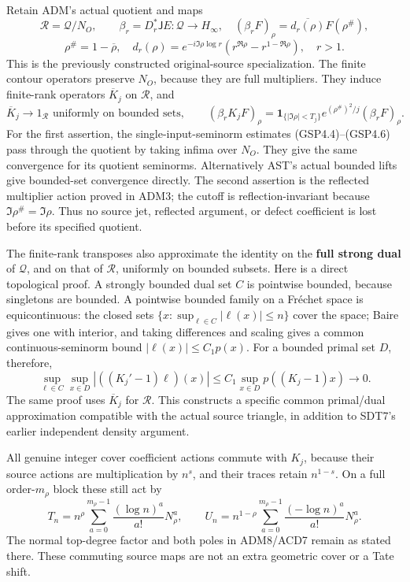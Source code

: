 Retain ADM's actual quotient and maps \[
\mathcal R=\mathcal Q/N_O,\qquad
\beta_r=D_r^*\mathsf J E:\mathcal Q\to H_\infty,
\quad (\beta_rF)_\rho=\overline{d_r(\rho)}F(\rho^\#),
\] \[
\rho^\#=1-\overline\rho,\quad
d_r(\rho)=e^{-i\Im\rho\log r}
(r^{\Re\rho}-r^{1-\Re\rho}),\quad r>1.
\tag{GSP7.1}
\] This is the previously constructed original-source specialization.
The finite contour operators preserve \(N_O\), because they are full
multipliers. They induce finite-rank operators \(\overline K_j\) on
\(\mathcal R\), and \[
\overline K_j\longrightarrow1_{\mathcal R}
\text{ uniformly on bounded sets},\qquad
(\beta_rK_jF)_\rho=
\mathbf1_{\{|\Im\rho|<T_j\}}e^{(\rho^\#)^2/j}(\beta_rF)_\rho.
\tag{GSP7.2}
\] For the first assertion, the single-input-seminorm estimates
(GSP4.4)--(GSP4.6) pass through the quotient by taking infima over
\(N_O\). They give the same convergence for its quotient seminorms.
Alternatively AST's actual bounded lifts give bounded-set convergence
directly. The second assertion is the reflected multiplier action proved
in ADM3; the cutoff is reflection-invariant because
\(\Im\rho^\#=\Im\rho\). Thus no source jet, reflected argument, or
defect coefficient is lost before its specified quotient.

The finite-rank transposes also approximate the identity on the
\textbf{full strong dual} of \(\mathcal Q\), and on that of
\(\mathcal R\), uniformly on bounded subsets. Here is a direct
topological proof. A strongly bounded dual set \(C\) is pointwise
bounded, because singletons are bounded. A pointwise bounded family on a
Fréchet space is equicontinuous: the closed sets
\(\{x:\sup_{\ell\in C}|\ell(x)|\le n\}\) cover the space; Baire gives
one with interior, and taking differences and scaling gives a common
continuous-seminorm bound \(|\ell(x)|\le C_1p(x)\). For a bounded primal
set \(D\), therefore, \[
\sup_{\ell\in C}\sup_{x\in D}
|((K_j'-1)\ell)(x)|
\le C_1\sup_{x\in D}p((K_j-1)x)\longrightarrow0.
\tag{GSP7.3}
\] The same proof uses \(\overline K_j\) for \(\mathcal R\). This
constructs a specific common primal/dual approximation compatible with
the actual source triangle, in addition to SDT7's earlier independent
density argument.

All genuine integer cover coefficient actions commute with \(K_j\),
because their source actions are multiplication by \(n^s\), and their
traces retain \(n^{1-s}\). On a full order-\(m_\rho\) block these still
act by \[
T_n=n^\rho\sum_{a=0}^{m_\rho-1}\frac{(\log n)^a}{a!}N_\rho^a,
\qquad U_n=n^{1-\rho}\sum_{a=0}^{m_\rho-1}\frac{(-\log n)^a}{a!}N_\rho^a.
\tag{GSP7.4}
\] The normal top-degree factor and both poles in ADM8/ACD7 remain as
stated there. These commuting source maps are not an extra geometric
cover or a Tate shift.

